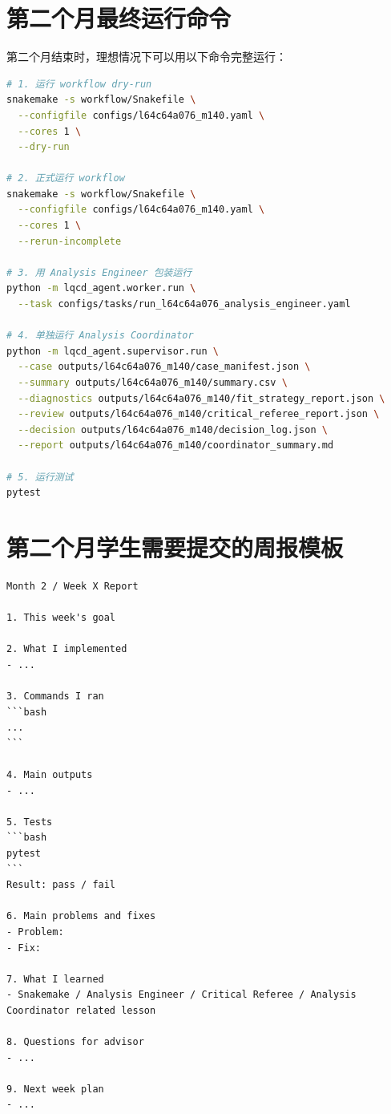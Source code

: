 \documentclass[11pt,a4paper,fontset=none]{ctexart}
\begin{document}
\newpage

\section{第二个月最终运行命令}

第二个月结束时，理想情况下可以用以下命令完整运行：

\begin{lstlisting}[language=bash]
# 1. 运行 workflow dry-run
snakemake -s workflow/Snakefile \
  --configfile configs/l64c64a076_m140.yaml \
  --cores 1 \
  --dry-run

# 2. 正式运行 workflow
snakemake -s workflow/Snakefile \
  --configfile configs/l64c64a076_m140.yaml \
  --cores 1 \
  --rerun-incomplete

# 3. 用 Analysis Engineer 包装运行
python -m lqcd_agent.worker.run \
  --task configs/tasks/run_l64c64a076_analysis_engineer.yaml

# 4. 单独运行 Analysis Coordinator
python -m lqcd_agent.supervisor.run \
  --case outputs/l64c64a076_m140/case_manifest.json \
  --summary outputs/l64c64a076_m140/summary.csv \
  --diagnostics outputs/l64c64a076_m140/fit_strategy_report.json \
  --review outputs/l64c64a076_m140/critical_referee_report.json \
  --decision outputs/l64c64a076_m140/decision_log.json \
  --report outputs/l64c64a076_m140/coordinator_summary.md

# 5. 运行测试
pytest
\end{lstlisting}

\section{第二个月学生需要提交的周报模板}

\begin{lstlisting}
Month 2 / Week X Report

1. This week's goal

2. What I implemented
- ...

3. Commands I ran
```bash
...
```

4. Main outputs
- ...

5. Tests
```bash
pytest
```
Result: pass / fail

6. Main problems and fixes
- Problem:
- Fix:

7. What I learned
- Snakemake / Analysis Engineer / Critical Referee / Analysis Coordinator related lesson

8. Questions for advisor
- ...

9. Next week plan
- ...
\end{lstlisting}
\end{document}
